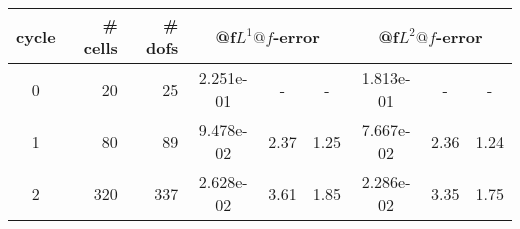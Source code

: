 \documentclass[10pt]{report}
\begin{document}
\begin{table}[H]
\begin{center}
\begin{tabular}{|c|r|r|c|c|c|c|c|c|} \hline
cycle & \# cells & \# dofs & 
\multicolumn{3}{|c|}{@f$L^1@f$-error} & 
\multicolumn{3}{|c|}{@f$L^2@f$-error}\\ \hline
0 & 20 & 25 & 2.251e-01 & - & - & 1.813e-01 & - & -\\ \hline
1 & 80 & 89 & 9.478e-02 & 2.37 & 1.25 & 7.667e-02 & 2.36 & 1.24\\ \hline
2 & 320 & 337 & 2.628e-02 & 3.61 & 1.85 & 2.286e-02 & 3.35 & 1.75\\ \hline
\end{tabular}
\end{center}
\end{table}
\end{document}

